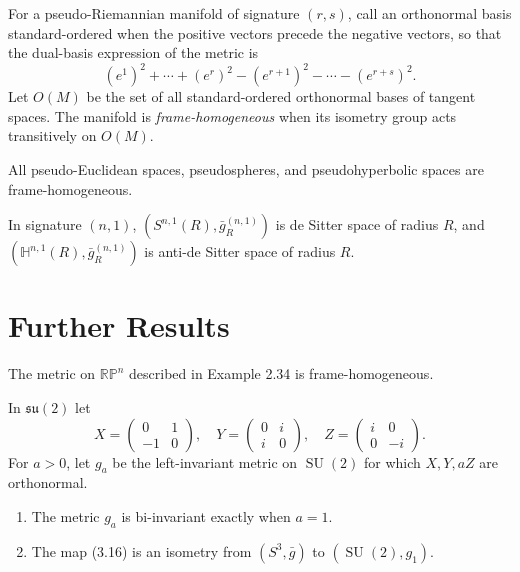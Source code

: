 For a pseudo-Riemannian manifold of signature $(r,s)$, call an orthonormal basis
standard-ordered when the positive vectors precede the negative vectors, so that
the dual-basis expression of the metric is
\[
(e^1)^2+\cdots+(e^r)^2-(e^{r+1})^2-\cdots-(e^{r+s})^2.
\]
Let $O(M)$ be the set of all standard-ordered orthonormal bases of tangent spaces.
The manifold is \emph{frame-homogeneous} when its isometry group acts transitively
on $O(M)$.

\begin{theorem}
\label{thm:frame-homogeneous-pseudo-riemannian}
All pseudo-Euclidean spaces, pseudospheres, and pseudohyperbolic spaces are
frame-homogeneous.
\end{theorem}

In signature $(n,1)$, $(S^{n,1}(R),\bar g_R^{(n,1)})$ is de Sitter space of
radius $R$, and $(\mathbb H^{n,1}(R),\bar g_R^{(n,1)})$ is anti-de Sitter space
of radius $R$.

\section{Further Results}

\begin{proposition}
\label{prop:rp-n-frame-homogeneous}
The metric on $\mathbb{RP}^n$ described in Example 2.34 is frame-homogeneous.
\end{proposition}

\begin{proposition}
\label{prop:berger-sphere}
In $\mathfrak{su}(2)$ let
\[
X=\begin{pmatrix}0&1\\-1&0\end{pmatrix},\quad
Y=\begin{pmatrix}0&i\\i&0\end{pmatrix},\quad
Z=\begin{pmatrix}i&0\\0&-i\end{pmatrix}.
\]
For $a>0$, let $g_a$ be the left-invariant metric on $\operatorname{SU}(2)$ for
which $X,Y,aZ$ are orthonormal.
\begin{enumerate}
\item[(a)] The metric $g_a$ is bi-invariant exactly when $a=1$.
\item[(b)] The map (3.16) is an isometry from
$(S^3,\bar g)$ to $(\operatorname{SU}(2),g_1)$.
\end{enumerate}
\end{proposition}

